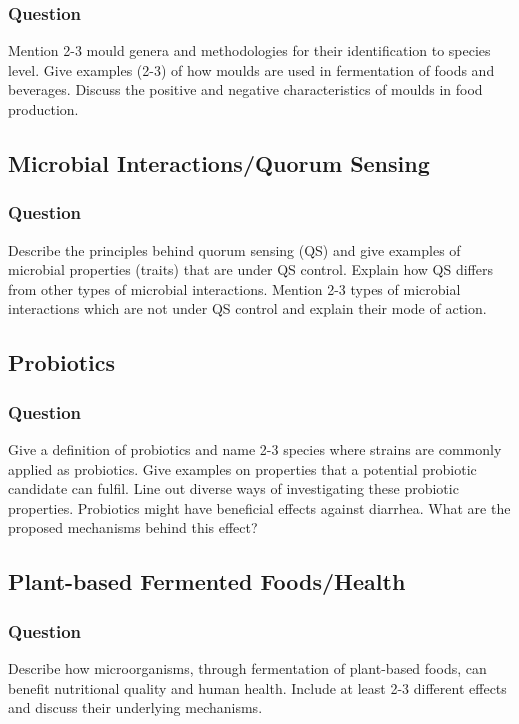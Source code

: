 \subsubsection*{Question}
Mention 2-3 mould genera and methodologies for their identification to species level. Give examples (2-3) of how moulds are used in fermentation of foods and beverages. Discuss the positive and negative characteristics of moulds in food production. 

\subsection{Microbial Interactions/Quorum Sensing}
\subsubsection*{Question}
Describe the principles behind quorum sensing (QS) and give examples of microbial properties (traits) that are under QS control. Explain how QS differs from other types of microbial interactions. Mention 2-3 types of microbial interactions which are not under QS control and explain their mode of action.  

\subsection{Probiotics}
\subsubsection*{Question}
Give a definition of probiotics and name 2-3 species where strains are commonly applied as probiotics. Give examples on properties that a potential probiotic candidate can fulfil. Line out diverse ways of investigating these probiotic properties. Probiotics might have beneficial effects against diarrhea. What are the proposed mechanisms behind this effect?

\subsection{Plant-based Fermented Foods/Health}
\subsubsection*{Question}
Describe how microorganisms, through fermentation of plant-based foods, can benefit nutritional quality and human health. Include at least 2-3 different effects and discuss their underlying mechanisms. 

